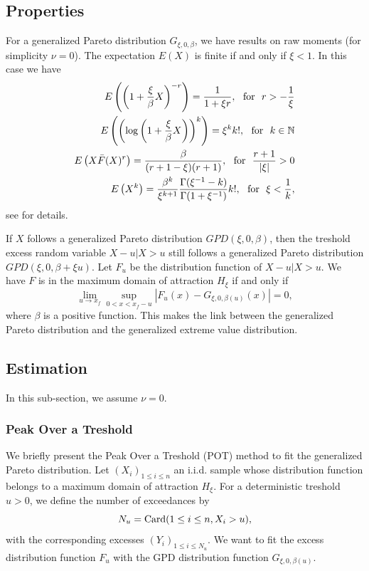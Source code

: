 \subsection{Properties}
For a generalized Pareto distribution $G_{\xi,0,\beta}$, we have results on raw moments (for simplicity $\nu=0$). The expectation $E(X)$ is finite if and only if $\xi<1$. In this case we have
\begin{align*}
E\left(\left(1+ \frac{\xi}{\beta}X\right)^{-r}\right) = \frac{1}{1+\xi r}, \textrm{~~for~~} r>-\frac{1}{\xi}\\
E\left(\left(\log\left(1+ \frac{\xi}{\beta}X\right)\right)^k\right) = \xi^k k!, \textrm{~~for~~} k \in\mathbb N\\
E\left(X \bar F(X)^r \right) = \frac{\beta}{(r+1-\xi)(r+1)}, \textrm{~~for~~} \frac{r+1}{|\xi|}>0\\
E\left(X^k\right) = \frac{\beta^k}{\xi^{k+1}} \frac{\Gamma(\xi^{-1}-k)}{\Gamma(1+\xi^{-1})} k!, \textrm{~~for~~} \xi <\frac{1}{k},
\end{align*}
see \cite{tve} for details.

If $X$ follows a generalized Pareto distribution $GPD(\xi,0,\beta)$, then the treshold excess random variable $X-u| X>u$ still follows a generalized Pareto distribution $GPD(\xi,0,\beta+\xi u)$. Let $F_u$ be the distribution function of $X-u| X>u$.
We have $F$ is in the maximum domain of attraction $H_\xi$ if and only if 
$$
\underset{u\rightarrow x_f}{\lim} \underset{0<x<x_f-u}{\sup}  \left|F_u(x) - G_{\xi,0,\beta(u)}(x)  \right| = 0,
$$
where $\beta$ is a positive function. This makes the link between the generalized Pareto distribution and the generalized extreme value distribution.


\subsection{Estimation}
In this sub-section, we assume $\nu=0$.

\subsubsection{Peak Over a Treshold}
We briefly present the Peak Over a Treshold (POT) method to fit the generalized Pareto distribution. Let $(X_i)_{1\leq i\leq n}$ an i.i.d. sample whose distribution function belongs to a maximum domain of attraction  $H_\xi$. For a deterministic treshold $u>0$, we define the number of exceedances by
$$
N_u %
= \card(1\leq i\leq n, X_i>u),
$$
with the corresponding excesses $(Y_i)_{1\leq i \leq N_u}$. We want to fit the excess distribution function $F_u$ with the GPD distribution function $G_{\xi,0,\beta(u)}$.

